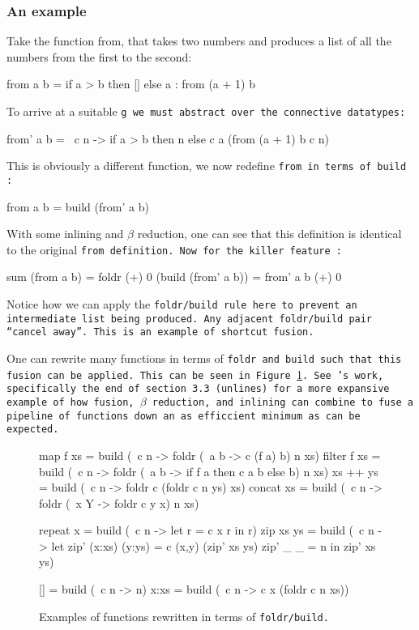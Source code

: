 \subsubsection{An example}
Take the function from, that takes two numbers and produces a list of all the numbers from the first to the second:
\begin{code}
    from a b = if a > b
               then []
               else a : from (a + 1) b
\end{code}
To arrive at a suitable \tt{g} we must abstract over the connective datatypes:
\begin{code}
    from' a b = \ c n  -> if a > b
                          then n
                          else c a (from (a + 1) b c n)
\end{code}
This is obviously a different function, we now redefine \tt{from} in terms of \tt{build} \citep{Gill1993}:
\begin{code}
    from a b = build (from' a b)
\end{code}
With some inlining and $\beta$ reduction, one can see that this definition is identical to the original \tt{from} definition. Now for the killer feature \citep{Gill1993}:
\begin{code}
    sum (from a b)
      = foldr (+) 0 (build (from' a b))
      = from' a b (+) 0
\end{code}
Notice how we can apply the \tt{foldr/build} rule here to prevent an intermediate list being produced. Any adjacent \tt{foldr/build} pair ``cancel away''.
This is an example of shortcut fusion.

One can rewrite many functions in terms of \tt{foldr} and \tt{build} such that this fusion can be applied. This can be seen in Figure \ref{fig:foldr/build_ex}.
See \cite{Gill1993}'s work, specifically the end of section 3.3 (\tt{unlines}) for a more expansive example of how fusion, $\beta$ reduction, and inlining can combine to fuse a pipeline of functions down an as efficcient minimum as can be expected.
\begin{figure}[h]
    \centering
    \begin{code}
    map f xs    = build (\ c n -> foldr (\ a b -> c (f a) b) n xs)
    filter f xs = build (\ c n -> foldr (\ a b -> if f a then c a b else b) n xs)
    xs ++ ys    = build (\ c n -> foldr c (foldr c n ys) xs)
    concat xs   = build (\ c n -> foldr (\ x Y -> foldr c y x) n xs)
    
    repeat x    = build (\ c n -> let r = c x r in r)
    zip xs ys   = build (\ c n -> let zip' (x:xs) (y:ys) = c (x,y) (zip' xs ys)
                                      zip' _      _      = n
                                      in zip' xs ys)

    []         = build (\ c n -> n)
    x:xs       = build (\ c n -> c x (foldr c n xs))
    \end{code}
    \caption{Examples of functions rewritten in terms of \tt{foldr/build}. \citep{Gill1993}}
    \label{fig:foldr/build_ex}
\end{figure}





